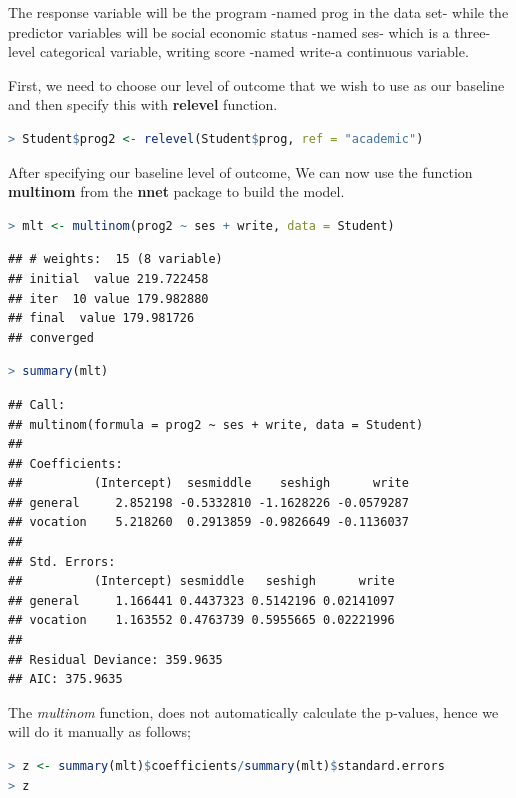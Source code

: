 \documentclass[
]{article}
\begin{document}
The response variable will be the program -named prog in the data set-
while the predictor variables will be social economic status -named ses-
which is a three-level categorical variable, writing score -named
write-a continuous variable.

First, we need to choose our level of outcome that we wish to use as our
baseline and then specify this with \textbf{relevel} function.

\begin{lstlisting}[language=R]
> Student$prog2 <- relevel(Student$prog, ref = "academic")
\end{lstlisting}

After specifying our baseline level of outcome, We can now use the
function \textbf{multinom} from the \textbf{nnet} package to build the
model.

\begin{lstlisting}[language=R]
> mlt <- multinom(prog2 ~ ses + write, data = Student)
\end{lstlisting}

\begin{lstlisting}
## # weights:  15 (8 variable)
## initial  value 219.722458 
## iter  10 value 179.982880
## final  value 179.981726 
## converged
\end{lstlisting}

\begin{lstlisting}[language=R]
> summary(mlt)
\end{lstlisting}

\begin{lstlisting}
## Call:
## multinom(formula = prog2 ~ ses + write, data = Student)
## 
## Coefficients:
##          (Intercept)  sesmiddle    seshigh      write
## general     2.852198 -0.5332810 -1.1628226 -0.0579287
## vocation    5.218260  0.2913859 -0.9826649 -0.1136037
## 
## Std. Errors:
##          (Intercept) sesmiddle   seshigh      write
## general     1.166441 0.4437323 0.5142196 0.02141097
## vocation    1.163552 0.4763739 0.5955665 0.02221996
## 
## Residual Deviance: 359.9635 
## AIC: 375.9635
\end{lstlisting}

The \emph{multinom} function, does not automatically calculate the
p-values, hence we will do it manually as follows;

\begin{lstlisting}[language=R]
> z <- summary(mlt)$coefficients/summary(mlt)$standard.errors
> z
\end{lstlisting}
\end{document}
